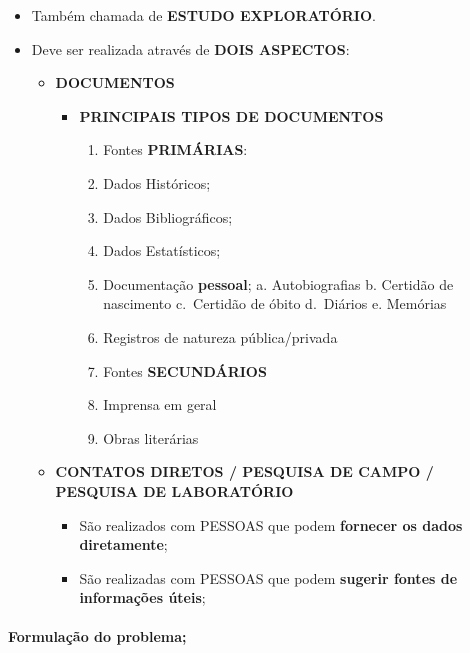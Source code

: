 \documentclass[
]{book}
\providecommand{\tightlist}{%
  \setlength{\itemsep}{0pt}\setlength{\parskip}{0pt}}
\begin{document}
\begin{itemize}
\tightlist
\item
  Também chamada de \textbf{ESTUDO EXPLORATÓRIO}.
\item
  Deve ser realizada através de \textbf{DOIS ASPECTOS}:

  \begin{itemize}
  \tightlist
  \item
    \textbf{DOCUMENTOS}

    \begin{itemize}
    \tightlist
    \item
      \textbf{PRINCIPAIS TIPOS DE DOCUMENTOS}

      \begin{enumerate}
      \def\labelenumi{\alph{enumi}.}
      \tightlist
      \item
        Fontes \textbf{PRIMÁRIAS}:
      \item
        Dados Históricos;
      \item
        Dados Bibliográficos;
      \item
        Dados Estatísticos;
      \item
        Documentação \textbf{pessoal};
        a. Autobiografias
        b. Certidão de nascimento
        c.~Certidão de óbito
        d.~Diários
        e. Memórias
      \item
        Registros de natureza pública/privada
      \item
        Fontes \textbf{SECUNDÁRIOS}
      \item
        Imprensa em geral
      \item
        Obras literárias
      \end{enumerate}
    \end{itemize}
  \item
    \textbf{CONTATOS DIRETOS / PESQUISA DE CAMPO / PESQUISA DE LABORATÓRIO}

    \begin{itemize}
    \tightlist
    \item
      São realizados com PESSOAS que podem \textbf{fornecer os dados diretamente};
    \item
      São realizadas com PESSOAS que podem \textbf{sugerir fontes de informações úteis};
    \end{itemize}
  \end{itemize}
\end{itemize}

\hypertarget{formulauxe7uxe3o-do-problema}{%
\paragraph{Formulação do problema;}\label{formulauxe7uxe3o-do-problema}}
\end{document}
